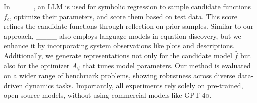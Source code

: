 In ____, an LLM is used for symbolic regression to sample candidate functions $f_c$, optimize their parameters, and score them based on test data. 
This score refines the candidate functions through reflection on prior samples. 
Similar to our approach, ____ also employs language models in equation discovery, but we enhance it by incorporating system observations like plots and descriptions. 
Additionally, we generate representations not only for the candidate model $\widehat{f}$ but also for the optimizer $A_\psi$ that tunes model parameters. 
Our method is evaluated on a wider range of benchmark problems, showing robustness across diverse data-driven dynamics tasks. 
Importantly, all experiments rely solely on pre-trained, open-source models, without using commercial models like \textsc{GPT-4o}.